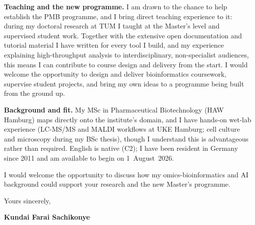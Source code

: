 \documentclass[12pt,a4paper]{article}
\begin{document}
\textbf{Teaching and the new programme.}
I am drawn to the chance to help establish the PMB programme, and I bring direct
teaching experience to it: during my doctoral research at TUM I taught at the
Master's level and supervised student work. Together with the extensive open
documentation and tutorial material I have written for every tool I build, and my
experience explaining high-throughput analysis to interdisciplinary,
non-specialist audiences, this means I can contribute to course design and
delivery from the start. I would welcome the opportunity to design and deliver
bioinformatics coursework, supervise student projects, and bring my own ideas to
a programme being built from the ground up.

\textbf{Background and fit.}
My MSc in Pharmaceutical Biotechnology (HAW Hamburg) maps directly onto the
institute's domain, and I have hands-on wet-lab experience (LC-MS/MS and MALDI
workflows at UKE Hamburg; cell culture and microscopy during my BSc thesis),
though I understand this is advantageous rather than required. English is native
(C2); I have been resident in Germany since 2011 and am available to begin on
1~August~2026.

I would welcome the opportunity to discuss how my omics-bioinformatics and AI
background could support your research and the new Master's programme.

\vspace{1.5em}
Yours sincerely,

\vspace{2.5em}
\textbf{Kundai Farai Sachikonye}
\end{document}
